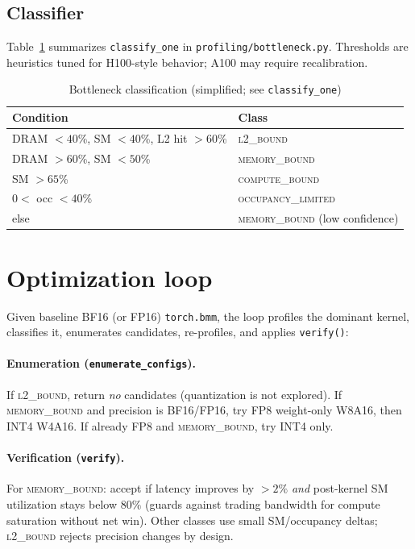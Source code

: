 \documentclass[11pt]{article}
\begin{document}
\subsection{Classifier}
Table~\ref{alg:class} summarizes \texttt{classify\_one} in \texttt{profiling/bottleneck.py}.
Thresholds are heuristics tuned for H100-style behavior; A100 may require recalibration.

\begin{table}[h]
\centering
\caption{Bottleneck classification (simplified; see \texttt{classify\_one})}
\label{alg:class}
\begin{tabular}{ll}
\toprule
Condition & Class \\
\midrule
DRAM $<40$\%, SM $<40$\%, L2 hit $>60$\% & \textsc{l2\_bound} \\
DRAM $>60$\%, SM $<50$\% & \textsc{memory\_bound} \\
SM $>65$\% & \textsc{compute\_bound} \\
$0<$ occ $<40$\% & \textsc{occupancy\_limited} \\
else & \textsc{memory\_bound} (low confidence) \\
\bottomrule
\end{tabular}
\end{table}

\section{Optimization loop}
Given baseline BF16 (or FP16) \texttt{torch.bmm}, the loop profiles the dominant kernel, classifies it, enumerates candidates, re-profiles, and applies \texttt{verify()}:

\paragraph{Enumeration (\texttt{enumerate\_configs}).}
If \textsc{l2\_bound}, return \emph{no} candidates (quantization is not explored).
If \textsc{memory\_bound} and precision is BF16/FP16, try FP8 weight-only W8A16, then INT4 W4A16.
If already FP8 and \textsc{memory\_bound}, try INT4 only.

\paragraph{Verification (\texttt{verify}).}
For \textsc{memory\_bound}: accept if latency improves by $>2\%$ \emph{and} post-kernel SM utilization stays below $80\%$ (guards against trading bandwidth for compute saturation without net win).
Other classes use small SM/occupancy deltas; \textsc{l2\_bound} rejects precision changes by design.
\end{document}
